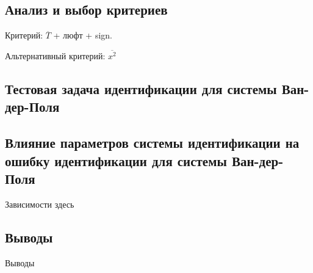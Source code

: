 \subsection{Анализ и выбор критериев}  %

Критерий:
$\overline{T}$ + люфт + sign.

Альтернативный критерий:
$\overline{x^2}$


\subsection{Тестовая задача идентификации для системы Ван-дер-Поля}  %



\subsection{Влияние параметров системы идентификации на ошибку идентификации для системы Ван-дер-Поля}  %


Зависимости здесь


\subsection{Выводы}  %

Выводы





